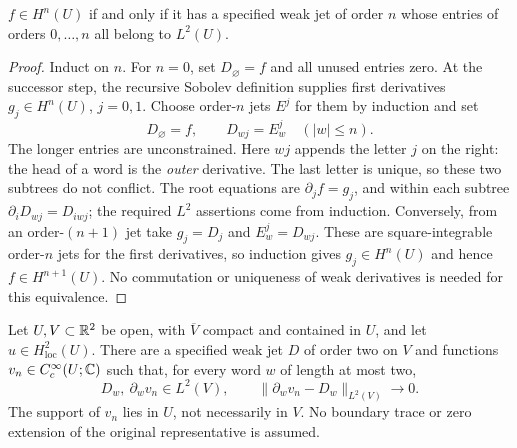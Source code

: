 \begin{lemma}
\label{lem:sobolev-weak-jets}
\leanok
$f\in H^n(U)$ if and only if it has a specified weak jet of order $n$
whose entries of orders $0,\ldots,n$ all belong to $L^2(U)$.
\end{lemma}

\begin{proof}
\leanok
Induct on $n$. For $n=0$, set $D_\varnothing=f$ and all unused entries
zero. At the successor step, the recursive Sobolev definition supplies
first derivatives $g_j\in H^n(U)$, $j=0,1$.
Choose order-$n$ jets $E^j$ for them by induction and set
\[
 D_\varnothing=f,\qquad D_{wj}=E^j_w\quad (|w|\le n).
\]
The longer entries are unconstrained. Here $wj$ appends the letter $j$ on
 the right: the head of a word is the \emph{outer} derivative. The last
 letter is unique, so these two subtrees do not conflict. The root equations are
$\partial_jf=g_j$, and within each subtree
$\partial_iD_{wj}=D_{iwj}$; the required $L^2$ assertions come from induction.
Conversely, from an order-$(n+1)$ jet take $g_j=D_j$ and
$E^j_w=D_{wj}$. These are square-integrable order-$n$ jets for the first
derivatives, so induction gives $g_j\in H^n(U)$ and hence
$f\in H^{n+1}(U)$. No commutation or uniqueness of weak derivatives is
needed for this equivalence.
\end{proof}

\begin{lemma}
\label{lem:local-h2-smooth-approximation}
\leanok
Let $U,V\subset\mathbb{R}^2$ be open, with $\overline V$ compact and contained
in $U$, and let $u\in H^2_{\mathrm{loc}}(U)$. There are a specified
weak jet $D$ of order two on $V$ and functions $v_n\in C_c^\infty(U;\mathbb{C})$
such that, for every word $w$ of length at most two,
\[
 D_w,\ \partial_wv_n\in L^2(V),\qquad
 \|\partial_wv_n-D_w\|_{L^2(V)}\longrightarrow0.
\]
The support of $v_n$ lies in $U$, not necessarily in $V$.
No boundary trace or zero extension of the original representative is assumed.
\end{lemma}

